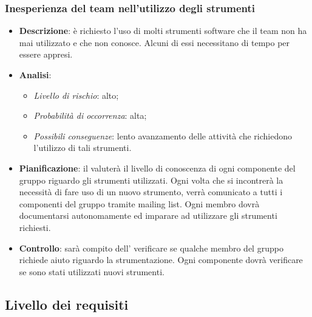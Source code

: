 		\subsubsection{Inesperienza del team nell'utilizzo degli strumenti}
			\begin{itemize}
				\item \textbf{Descrizione}: è richiesto l'uso di molti strumenti software che il team non ha mai utilizzato e che non conosce. Alcuni di essi necessitano di tempo per essere appresi.
				\item \textbf{Analisi}:
				\begin{itemize}
					\item \textit{Livello di rischio}: alto;
					\item \textit{Probabilità di occorrenza}: alta;
					\item \textit{Possibili conseguenze}: lento avanzamento delle attività che richiedono l'utilizzo di tali strumenti.
				\end{itemize}
				\item \textbf{Pianificazione}: il  valuterà il livello di conoscenza di ogni componente del gruppo riguardo gli strumenti utilizzati. Ogni volta che si incontrerà la necessità di fare uso di un nuovo strumento, verrà comunicato a tutti i componenti del gruppo tramite mailing list. Ogni membro dovrà documentarsi autonomamente ed imparare ad utilizzare gli strumenti richiesti.
				\item \textbf{Controllo}: sarà compito dell' verificare se qualche membro del gruppo richiede aiuto riguardo la strumentazione. Ogni componente dovrà verificare se sono stati utilizzati nuovi strumenti.
			\end{itemize}
	\subsection{Livello dei requisiti}
